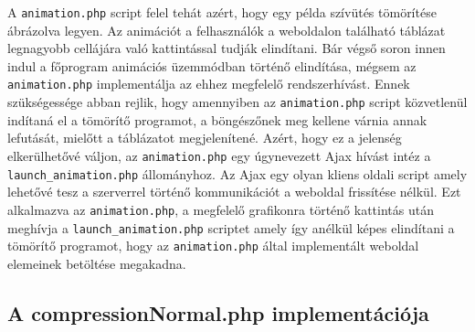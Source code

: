 \documentclass[oneside,titlepage,12pt,a4paper]{report}
\begin{document}
\par A \texttt{animation.php} script felel tehát azért, hogy egy példa szívütés tömörítése ábrázolva legyen. Az animációt a felhasználók a weboldalon található táblázat legnagyobb cellájára való kattintással tudják elindítani. Bár végső soron innen indul a főprogram animációs üzemmódban történő elindítása, mégsem az \texttt{animation.php} implementálja az ehhez megfelelő rendszerhívást. Ennek szükségessége abban rejlik, hogy amennyiben az \texttt{animation.php} script közvetlenül indítaná el a tömörítő programot, a böngészőnek meg kellene várnia annak lefutását, mielőtt a táblázatot megjelenítené. Azért, hogy ez a jelenség elkerülhetővé váljon, az \texttt{animation.php} egy úgynevezett Ajax hívást intéz a \texttt{launch\_animation.php} állományhoz. Az Ajax egy olyan kliens oldali script amely lehetővé tesz a szerverrel történő kommunikációt a weboldal frissítése nélkül. Ezt alkalmazva az \texttt{animation.php}, a megfelelő grafikonra történő kattintás után meghívja a \texttt{launch\_animation.php} scriptet amely így anélkül képes elindítani a tömörítő programot, hogy az \texttt{animation.php} által implementált weboldal elemeinek betöltése megakadna.  

\subsection{A compressionNormal.php implementációja }
\end{document}
